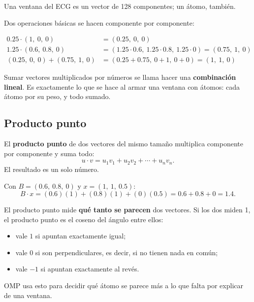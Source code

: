 \documentclass[11pt,letterpaper]{article}
\begin{document}
Una ventana del ECG es un vector de 128 componentes; un átomo, también.

Dos operaciones básicas se hacen componente por componente:

\begin{ejemplo}
    \begin{align*}
        0.25 \cdot (1,\ 0,\ 0)
            &= (0.25,\ 0,\ 0) \\
        1.25 \cdot (0.6,\ 0.8,\ 0)
            &= (1.25 \cdot 0.6,\ 1.25 \cdot 0.8,\ 1.25 \cdot 0)
             = (0.75,\ 1,\ 0) \\
        (0.25,\ 0,\ 0) + (0.75,\ 1,\ 0)
            &= (0.25 + 0.75,\ 0 + 1,\ 0 + 0) = (1,\ 1,\ 0)
    \end{align*}
\end{ejemplo}

Sumar vectores multiplicados por números se llama hacer una
\textbf{combinación lineal}. Es exactamente lo que se hace al armar una
ventana con átomos: cada átomo por su peso, y todo sumado.

\subsection*{Producto punto}

\begin{definicion}
    El \textbf{producto punto} de dos vectores del mismo tamaño
    multiplica componente por componente y suma todo:
    \[
        u \cdot v = u_1 v_1 + u_2 v_2 + \cdots + u_n v_n .
    \]
    El resultado es un solo número.
\end{definicion}

\begin{ejemplo}
    Con $B = (0.6,\ 0.8,\ 0)$ y $x = (1,\ 1,\ 0.5)$:
    \[
        B \cdot x = (0.6)(1) + (0.8)(1) + (0)(0.5)
                  = 0.6 + 0.8 + 0 = 1.4 .
    \]
\end{ejemplo}

\begin{idea}
    El producto punto mide \textbf{qué tanto se parecen} dos vectores.
    Si los dos miden 1, el producto punto es el coseno del ángulo entre
    ellos:
    \begin{itemize}[itemsep=0.1em]
        \item vale $1$ si apuntan exactamente igual;
        \item vale $0$ si son perpendiculares, es decir, si no tienen
              nada en común;
        \item vale $-1$ si apuntan exactamente al revés.
    \end{itemize}
    OMP usa esto para decidir qué átomo se parece más a lo que falta
    por explicar de una ventana.
\end{idea}
\end{document}

